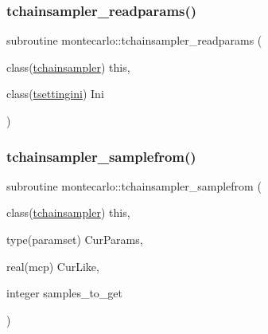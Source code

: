 \mbox{\label{namespacemontecarlo_af71e0b87a06570ba3678ee96cd444f6e}} 
\subsubsection{\texorpdfstring{tchainsampler\+\_\+readparams()}{tchainsampler\_readparams()}}
{\footnotesize\ttfamily subroutine montecarlo\+::tchainsampler\+\_\+readparams (\begin{DoxyParamCaption}\item[{class(\mbox{\hyperlink{structmontecarlo_1_1tchainsampler}{tchainsampler}})}]{this,  }\item[{class(\mbox{\hyperlink{structsettings_1_1tsettingini}{tsettingini}})}]{Ini }\end{DoxyParamCaption})\hspace{0.3cm}{\ttfamily [private]}}

\mbox{\label{namespacemontecarlo_ae6147d7e7b017c36b225c6b101d896bd}} 
\subsubsection{\texorpdfstring{tchainsampler\+\_\+samplefrom()}{tchainsampler\_samplefrom()}}
{\footnotesize\ttfamily subroutine montecarlo\+::tchainsampler\+\_\+samplefrom (\begin{DoxyParamCaption}\item[{class(\mbox{\hyperlink{structmontecarlo_1_1tchainsampler}{tchainsampler}})}]{this,  }\item[{type(paramset)}]{Cur\+Params,  }\item[{real(mcp)}]{Cur\+Like,  }\item[{integer}]{samples\+\_\+to\+\_\+get }\end{DoxyParamCaption})\hspace{0.3cm}{\ttfamily [private]}}

\mbox{\label{namespacemontecarlo_ac9b47ebdfecc65b4663d59c74da8e573}} 
